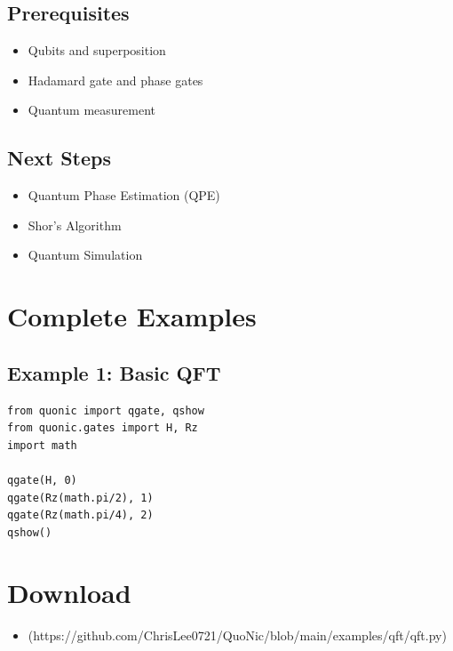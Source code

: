 \documentclass[12pt,a4paper]{article}
\begin{document}
\subsection{Prerequisites}
\begin{itemize}
  \item Qubits and superposition
  \item Hadamard gate and phase gates
  \item Quantum measurement
\end{itemize}

\subsection{Next Steps}
\begin{itemize}
  \item Quantum Phase Estimation (QPE)
  \item Shor's Algorithm
  \item Quantum Simulation
\end{itemize}

\section{Complete Examples}

\subsection{Example 1: Basic QFT}

\begin{verbatim}
from quonic import qgate, qshow
from quonic.gates import H, Rz
import math

qgate(H, 0)
qgate(Rz(math.pi/2), 1)
qgate(Rz(math.pi/4), 2)
qshow()
\end{verbatim}

\section{Download}

\begin{itemize}
  \item [qft.py](https://github.com/ChrisLee0721/QuoNic/blob/main/examples/qft/qft.py)
\end{itemize}
\end{document}
